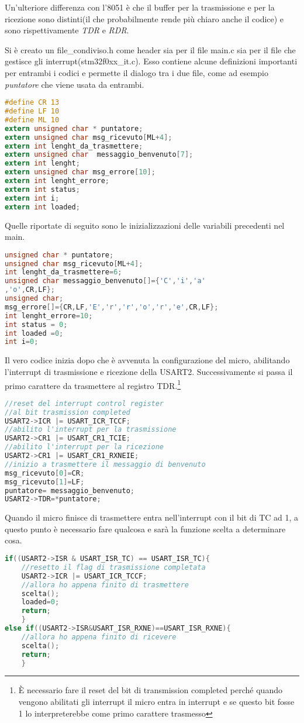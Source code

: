 \documentclass[main.tex]{subfiles}
\begin{document}
Un'ulteriore differenza con l'8051 è che il buffer per la trasmissione e per la ricezione sono distinti(il che probabilmente rende più chiaro anche il codice) e sono rispettivamente \textit{TDR} e \textit{RDR}. 

Si è creato un file\_condiviso.h come header sia per il file main.c sia per il file che gestisce gli interrupt(stm32f0xx\_it.c). Esso contiene alcune definizioni importanti per entrambi i codici e permette il dialogo tra i due file, come ad esempio \textit{puntatore} che viene usata da entrambi.
\begin{lstlisting}[language=C,caption=Header dei files]
#define CR 13
#define LF 10
#define ML 10
extern unsigned char * puntatore;
extern unsigned char msg_ricevuto[ML+4];
extern int lenght_da_trasmettere;
extern unsigned char  messaggio_benvenuto[7];
extern int lenght;
extern unsigned char msg_errore[10];
extern int lenght_errore;
extern int status;
extern int i;
extern int loaded;
\end{lstlisting}
Quelle riportate di seguito sono le inizializzazioni delle variabili precedenti nel main.
\begin{lstlisting}[language=c,caption=Inizializzazione variabili]
unsigned char * puntatore;
unsigned char msg_ricevuto[ML+4];
int lenght_da_trasmettere=6;
unsigned char messaggio_benvenuto[]={'C','i','a'
,'o',CR,LF};
unsigned char;
msg_errore[]={CR,LF,'E','r','r','o','r','e',CR,LF};
int lenght_errore=10;
int status = 0;
int loaded =0;
int i=0;
\end{lstlisting}

Il vero codice inizia dopo che è avvenuta la configurazione del micro, abilitando l'interrupt di trasmissione e ricezione della USART2. Successivamente si passa il primo carattere da trasmettere al registro TDR.\footnote{È necessario fare il reset del bit di transmission completed perché quando vengono abilitati gli interrupt il micro entra in interrupt e se questo bit fosse 1 lo interpreterebbe come primo carattere trasmesso}
\begin{lstlisting}[language=C,caption=main]
//reset del interrupt control register
//al bit trasmission completed
USART2->ICR |= USART_ICR_TCCF;
//abilito l'interrupt per la trasmissione
USART2->CR1 |= USART_CR1_TCIE;
//abilito l'interrupt per la ricezione
USART2->CR1 |= USART_CR1_RXNEIE;
//inizio a trasmettere il messaggio di benvenuto
msg_ricevuto[0]=CR;
msg_ricevuto[1]=LF;
puntatore= messaggio_benvenuto;
USART2->TDR=*puntatore;
\end{lstlisting}
Quando il micro finisce di trasmettere entra nell'interrupt con il bit di TC ad 1, a questo punto è necessario fare qualcosa e sarà la funzione scelta a determinare cosa.
\begin{lstlisting}[language=C, caption=gestione dell'interrupt]
if((USART2->ISR & USART_ISR_TC) == USART_ISR_TC){
	//resetto il flag di trasmissione completata
	USART2->ICR |= USART_ICR_TCCF;
	//allora ho appena finito di trasmettere
	scelta();
	loaded=0;
	return;
	}
else if((USART2->ISR&USART_ISR_RXNE)==USART_ISR_RXNE){
	//allora ho appena finito di ricevere
	scelta();
	return;
	}
\end{lstlisting}
\end{document}
